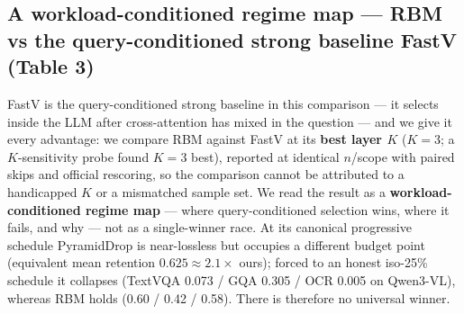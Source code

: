 \documentclass[sigconf,review,anonymous]{acmart}
\begin{document}
\subsection{A workload-conditioned regime map --- RBM vs the query-conditioned strong baseline FastV (Table 3)}\label{sec:fastv}

FastV is the query-conditioned strong baseline in this comparison --- it
selects inside the LLM after cross-attention has mixed in the question --- and
we give it every advantage: we compare RBM against FastV at its \textbf{best
layer $K$} ($K = 3$; a $K$-sensitivity probe found $K = 3$ best), reported at
identical $n$/scope with paired skips and official rescoring, so the comparison
cannot be attributed to a handicapped $K$ or a mismatched sample set. We read
the result as a \textbf{workload-conditioned regime map} --- where
query-conditioned selection wins, where it fails, and why --- not as a
single-winner race. At its canonical progressive schedule
PyramidDrop is near-lossless but occupies a different budget point (equivalent
mean retention $0.625 \approx 2.1\times$ ours); forced to an honest iso-25\%
schedule it collapses (TextVQA 0.073 / GQA 0.305 / OCR 0.005 on Qwen3-VL),
whereas RBM holds (0.60 / 0.42 / 0.58). There is therefore no universal winner.
\end{document}

